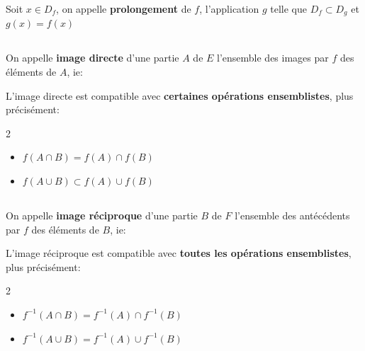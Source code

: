 Soit \(x \in D_f\), on appelle \textbf{prolongement} de \(f\), l'application \(g\) telle que \(D_f \subset D_g\) et \(g(x) = f(x)\)

\subsection*{}

On appelle \textbf{image directe} d'une partie \(A\) de \(E\) l'ensemble des images par \(f\) des éléments de \(A\), ie:

L'image directe est compatible avec \textbf{certaines opérations ensemblistes}, plus précisément:
\begin{multicols}{2}
    \begin{itemize}
        \item \(f(A \cap B) = f(A) \cap f(B)\)
        \item \(f(A \cup B) \subset f(A) \cup f(B)\)
    \end{itemize}
\end{multicols}

\subsection*{}
On appelle \textbf{image réciproque} d'une partie \(B\) de \(F\) l'ensemble des antécédents par \(f\) des éléments de \(B\), ie:

L'image réciproque est compatible avec \textbf{toutes les opérations ensemblistes}, plus précisément:
\begin{multicols}{2}
    \begin{itemize}
        \item \(f^{-1}(A \cap B) = f^{-1}(A) \cap f^{-1}(B)\)
        \item \(f^{-1}(A \cup B) = f^{-1}(A) \cup f^{-1}(B)\)
    \end{itemize}
\end{multicols}

\subsection*{}


